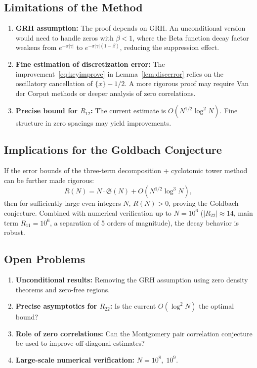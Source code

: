 \documentclass[11pt,a4paper]{article}
\theoremstyle{remark}
\begin{document}
\subsection{Limitations of the Method}

\begin{enumerate}
\item \textbf{GRH assumption:} The proof depends on GRH. An unconditional version would need to handle zeros with $\beta < 1$, where the Beta function decay factor weakens from $e^{-\pi|\gamma|}$ to $e^{-\pi|\gamma|(1-\beta)}$, reducing the suppression effect.
\item \textbf{Fine estimation of discretization error:} The improvement~\eqref{eq:keyimprove} in Lemma~\ref{lem:discerror} relies on the oscillatory cancellation of $\{x\}-1/2$. A more rigorous proof may require Van der Corput methods or deeper analysis of zero correlations.
\item \textbf{Precise bound for $R_{12}$:} The current estimate is $O(N^{1/2}\log^2 N)$. Fine structure in zero spacings may yield improvements.
\end{enumerate}

\subsection{Implications for the Goldbach Conjecture}

If the error bounds of the three-term decomposition + cyclotomic tower method can be further made rigorous:
\[
R(N) = N \cdot \mathfrak{S}(N) + O(N^{1/2}\log^3 N),
\]
then for sufficiently large even integers $N$, $R(N) > 0$, proving the Goldbach conjecture. Combined with numerical verification up to $N = 10^6$ ($|R_{22}| \approx 14$, main term $R_{11} = 10^6$, a separation of 5 orders of magnitude), the decay behavior is robust.

\subsection{Open Problems}

\begin{enumerate}
\item \textbf{Unconditional results:} Removing the GRH assumption using zero density theorems and zero-free regions.
\item \textbf{Precise asymptotics for $R_{22}$:} Is the current $O(\log^2 N)$ the optimal bound?
\item \textbf{Role of zero correlations:} Can the Montgomery pair correlation conjecture be used to improve off-diagonal estimates?
\item \textbf{Large-scale numerical verification:} $N = 10^8,\; 10^9$.
\end{enumerate}
\end{document}
